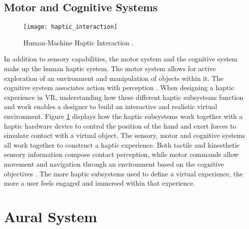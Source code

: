  
\subsection{Motor and Cognitive Systems} \label{motor_cognitive}
 
 
 \begin{figure}[h]
 	\centering
 	\texttt{[image: haptic\_interaction]}
 	\caption{Human-Machine Haptic Interaction \cite{ganesan}.}
 	\label{fig:haptic_loop}
 \end{figure}
 
 
  \par In addition to sensory capabilities, the motor system and the cognitive system make up the human haptic system. The motor system allows for active exploration of an environment and manipulation of objects within it.  The cognitive system associates action with perception \cite{mihelj_haptics}.  When designing a haptic experience in VR, understanding how these different haptic subsystems function and work enables a designer to build an interactive and realistic virtual environment. Figure \ref{fig:haptic_loop} displays how the haptic subsystems work together with a haptic hardware device to control the position of the hand and exert forces to simulate contact with a virtual object. The sensory, motor and cognitive systems all work together to construct a haptic experience. Both tactile and kinesthetic sensory information compose contact perception, while motor commands allow movement and navigation through an environment based on the cognitive objectives \cite{mihelj_haptics}. The more haptic subsystems used to define a virtual experience, the more a user feels engaged and immersed within that experience. 
 
 




\section{Aural System} \label{sound}

